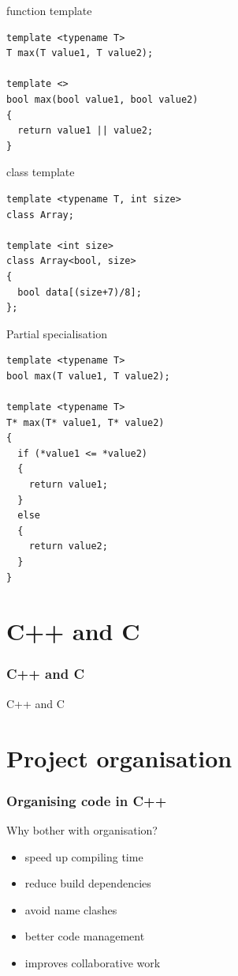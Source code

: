 \documentclass{beamer}
\begin{document}
\begin{frame}[fragile]{function template}
\begin{lstlisting}
template <typename T>
T max(T value1, T value2);

template <>
bool max(bool value1, bool value2)
{
  return value1 || value2; 
}
\end{lstlisting}
\end{frame}

\begin{frame}[fragile]{class template}
\begin{lstlisting}
template <typename T, int size>
class Array;

template <int size>
class Array<bool, size>
{
  bool data[(size+7)/8];
};
\end{lstlisting}
\end{frame}

\begin{frame}[fragile]{Partial specialisation}
\begin{lstlisting}
template <typename T>
bool max(T value1, T value2);

template <typename T>
T* max(T* value1, T* value2)
{
  if (*value1 <= *value2)
  {
    return value1;
  } 
  else
  {
    return value2;
  }
}

\end{lstlisting}
\end{frame}

\part{C++ and C}
\section{C++ and C}
\begin{frame}{C++ and C}
\end{frame}


\part{Project organisation}

\section{Organising code in C++}

\begin{frame}{Why bother with organisation?}
\begin{itemize}
  \item speed up compiling time
  \item reduce build dependencies
  \item avoid name clashes
  \item better code management
  \item improves collaborative work
\end{itemize}
\end{frame}
\end{document}
